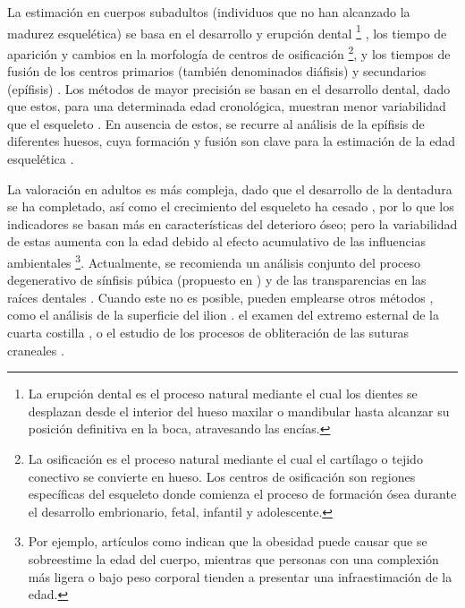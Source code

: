 La estimación en cuerpos subadultos (individuos que no han alcanzado la madurez esquelética) se basa en el 
desarrollo y erupción dental
\footnote{
    La erupción dental es el proceso natural mediante el cual los dientes se desplazan desde el interior del 
    hueso maxilar o mandibular hasta alcanzar su posición definitiva en la boca, atravesando las encías.
} \cite{cameriere2006}, 
los tiempo de aparición y cambios en la morfología de centros de osificación
\footnote{
    La osificación es el proceso natural mediante el cual el cartílago o tejido conectivo se convierte en 
    hueso. Los centros de osificación son regiones específicas del esqueleto donde comienza el proceso de 
    formación ósea durante el desarrollo embrionario, fetal, infantil y adolescente.
},
y los tiempos de fusión de los centros primarios (también denominados diáfisis) y secundarios (epífisis) 
\cite{scheuer2000, adserias2019}. 
Los métodos de mayor precisión se basan en el desarrollo dental, dado que estos, para una determinada
edad cronológica, muestran menor variabilidad que el esqueleto \cite{bowman1992}. En ausencia de estos, 
se recurre al análisis de la epífisis de diferentes huesos, cuya formación y fusión son clave para la 
estimación de la edad esquelética \cite{adserias2019}.

La valoración en adultos es más compleja, dado que el desarrollo de la dentadura se ha completado, 
así como el crecimiento del esqueleto ha cesado \cite{byers2023}, por lo que los indicadores 
se basan más en características del deterioro óseo; pero la variabilidad de estas aumenta con la 
edad debido al efecto acumulativo de las influencias ambientales \cite{ubelaker2018, scheuer2004} 
\footnote{
    Por ejemplo, artículos como \cite{merritt2015,wescott2015} indican que la obesidad puede causar que se 
    sobreestime la edad del cuerpo, mientras que personas con una complexión más ligera o bajo peso corporal 
    tienden a presentar una infraestimación de la edad.
}. 
Actualmente, se recomienda un análisis conjunto del proceso degenerativo de sínfisis púbica (propuesto 
en \cite{brooks1990}) y de las transparencias en las raíces dentales \cite{baccino2014}. 
Cuando este no es posible, pueden emplearse otros métodos \cite{garvin2012}, como
el análisis de la superficie del ilion \cite{lovejoy1985}. el examen del extremo esternal de la cuarta
costilla \cite{iscan1984}, o el estudio de los procesos de obliteración de las suturas craneales 
\cite{meindl1985}.


